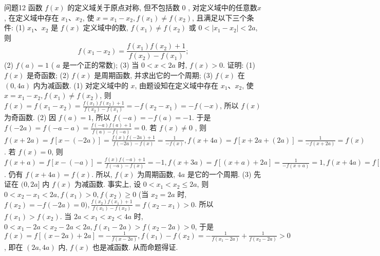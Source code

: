 问题12 函数 $f(x)$ 的定义域关于原点对称, 但不包括数 0 , 对定义域中的任意数$x$, 在定义域中存在 $x_1 、 x_2$, 使 $x=x_1-x_2, f\left(x_1\right) \neq f\left(x_2\right)$, 且满足以下三个条件:
(1) $x_1 、 x_2$ 是 $f(x)$ 定义域中的数, $f\left(x_1\right) \neq f\left(x_2\right)$ 或 $0<\left|x_1-x_2\right|< 2 a$, 则
$$
f\left(x_1-x_2\right)=\frac{f\left(x_1\right) f\left(x_2\right)+1}{f\left(x_2\right)-f\left(x_1\right)} ;
$$
(2) $f(a)=1$ ( $a$ 是一个正的常数);
(3) 当 $0<x<2 a$ 时, $f(x)>0$.
证明: (1) $f(x)$ 是奇函数;
(2) $f(x)$ 是周期函数, 并求出它的一个周期;
(3) $f(x)$ 在 $(0,4 a)$ 内为减函数.
(1) 对定义域中的 $x$, 由题设知在定义域中存在 $x_1 、 x_2$, 使 $x=x_1- x_2, f\left(x_1\right) \neq f\left(x_2\right)$, 则 $f(x)=f\left(x_1-x_2\right)=\frac{f\left(x_1\right) f\left(x_2\right)+1}{f\left(x_2\right)-f\left(x_1\right)}=-f\left(x_2-\right. \left.x_1\right)=-f(-x)$, 所以 $f(x)$ 为奇函数.
(2) 因 $f(a)=1$, 所以 $f(-a)= -f(a)=-1$. 于是 $f(-2 a)=f(-a-a)=\frac{f(-a) f(a)+1}{f(a)-f(-a)}=0$. 若 $f(x) \neq 0$ , 则 $f(x+2 a)=f[x-(-2 a)]=\frac{f(x) f(-2 a)+1}{f(-2 a)-f(x)}=\frac{1}{-f(x)}, f(x+ 4 a)=f[x+2 a+(2 a)]=\frac{1}{-f(x+2 a)}=f(x)$. 若 $f(x)=0$, 则 $f(x+a)= f[x-(-a)]=\frac{f(x) f(-a)+1}{f(-a)-f(x)}=-1, f(x+3 a)=f[(x+a)+2 a]= \frac{1}{-f(x+a)}=1, f(x+4 a)=f[(x+3 a)-(-a)]=\frac{f(x+3 a) f(-a)+1}{f(-a)-f(x+3 a)}=0$  . 仍有 $f(x+4 a)=f(x)$. 所以, $f(x)$ 为周期函数, $4 a$ 是它的一个周期.
(3) 先证在 $(0,2 a]$ 内 $f(x)$ 为减函数.
事实上, 设 $0<x_1<x_2 \leqslant 2 a$, 则 $0< x_2-x_1<2 a, f\left(x_1\right)>0, f\left(x_2\right) \geqslant 0$ (当 $x_2=2 a$ 时, $f\left(x_2\right)=-f(-2 a)= 0), \frac{f\left(x_2\right) f\left(x_1\right)+1}{f\left(x_1\right)-f\left(x_2\right)}=f\left(x_2-x_1\right)>0$. 所以 $f\left(x_1\right)>f\left(x_2\right)$. 当 $2 a<x_1< x_2<4 a$ 时, $0<x_1-2 a<x_2-2 a<2 a, f\left(x_1-2 a\right)>f\left(x_2-2 a\right)>0$, 于是 $f(x)=f[(x-2 a)+2 a]=-\frac{1}{f(x-2 a)}, f\left(x_1\right)-f\left(x_2\right)=-\frac{1}{f\left(x_1-2 a\right)}+ \frac{1}{f\left(x_2-2 a\right)}>0$, 即在 $(2 a, 4 a)$ 内, $f(x)$ 也是减函数.
从而命题得证.


